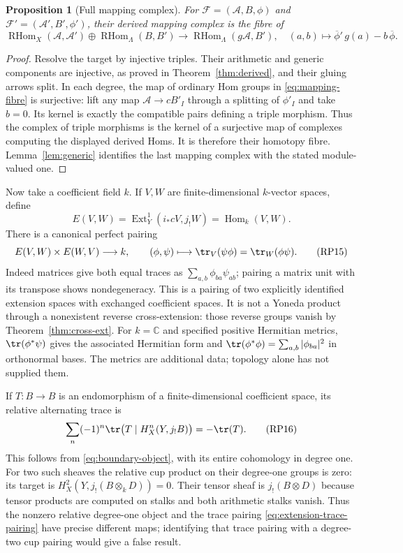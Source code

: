 \documentclass[11pt,a4paper]{article}
\newtheorem{proposition}[theorem]{Proposition}
\theoremstyle{definition}\newtheorem{definition}[theorem]{Definition}
\providecommand{\Hom}{\operatorname{Hom}}
\providecommand{\Ext}{\operatorname{Ext}}
\providecommand{\RHom}{\operatorname{RHom}}
\begin{document}
\begin{proposition}[Full mapping complex]\label{prop:mapping-complex}
For $\mathcal F=(\mathcal A,B,\phi)$ and
$\mathcal F'=(\mathcal A',B',\phi')$, their derived mapping complex is
the fibre of
\[
 \RHom_X(\mathcal A,\mathcal A')\oplus\RHom_\Lambda(B,B')
 \longrightarrow\RHom_\Lambda(g\mathcal A,B'),
 \quad (a,b)\longmapsto\overline\phi'\,g(a)-b\,\overline\phi.
 \tag{RP13}\label{eq:mapping-fibre}
\]
\end{proposition}
\begin{proof}
Resolve the target by injective triples. Their arithmetic and generic
components are injective, as proved in Theorem~\ref{thm:derived}, and
their gluing arrows split. In each degree, the map of ordinary Hom
groups in \eqref{eq:mapping-fibre} is surjective: lift any map
$\mathcal A\to cB'_I$ through a splitting of $\phi'_I$ and take $b=0$.
Its kernel is exactly the compatible pairs defining a triple morphism.
Thus the complex of triple morphisms is the kernel of a surjective
map of complexes computing the displayed derived Homs. It is therefore
their homotopy fibre. Lemma~\ref{lem:generic} identifies the last
mapping complex with the stated module-valued one.
\end{proof}

Now take a coefficient field $k$. If $V,W$ are finite-dimensional
$k$-vector spaces, define
\[
 E(V,W)=\Ext_Y^1(i_*cV,j_!W)=\Hom_k(V,W).
 \tag{RP14}\label{eq:extension-pairing-space}
\]
There is a canonical perfect pairing
\[
 E(V,W)\times E(W,V)\longrightarrow k,
 \qquad (\phi,\psi)\longmapsto\tr_V(\psi\phi)=\tr_W(\phi\psi).
 \tag{RP15}\label{eq:extension-trace-pairing}
\]
Indeed matrices give both equal traces as
$\sum_{a,b}\phi_{ba}\psi_{ab}$; pairing a matrix unit with its transpose
shows nondegeneracy. This is a pairing of two explicitly identified
extension spaces with exchanged coefficient spaces. It is not a Yoneda
product through a nonexistent reverse cross-extension: those reverse
groups vanish by Theorem~\ref{thm:cross-ext}. For $k=\mathbb C$ and
specified positive Hermitian metrics, $\tr(\phi^*\psi)$ gives the
associated Hermitian form and $\tr(\phi^*\phi)=\sum_{a,b}|\phi_{ba}|^2$
in orthonormal bases. The metrics are additional data; topology alone
has not supplied them.

If $T:B\to B$ is an endomorphism of a finite-dimensional coefficient
space, its relative alternating trace is
\[
 \sum_n(-1)^n\tr\bigl(T\mid H_X^n(Y,j_!B)\bigr)=-\tr(T).
 \tag{RP16}\label{eq:relative-trace}
\]
This follows from \eqref{eq:boundary-object}, with its entire
cohomology in degree one. For two such sheaves the relative cup product
on their degree-one groups is zero: its target is
$H_X^2(Y,j_!(B\otimes_k D))=0$. Their tensor sheaf is $j_!(B\otimes D)$
because tensor products are computed on stalks and both arithmetic
stalks vanish. Thus the nonzero relative degree-one object and the
trace pairing \eqref{eq:extension-trace-pairing} have precise different
maps; identifying that trace pairing with a degree-two cup pairing
would give a false result.
\end{document}
